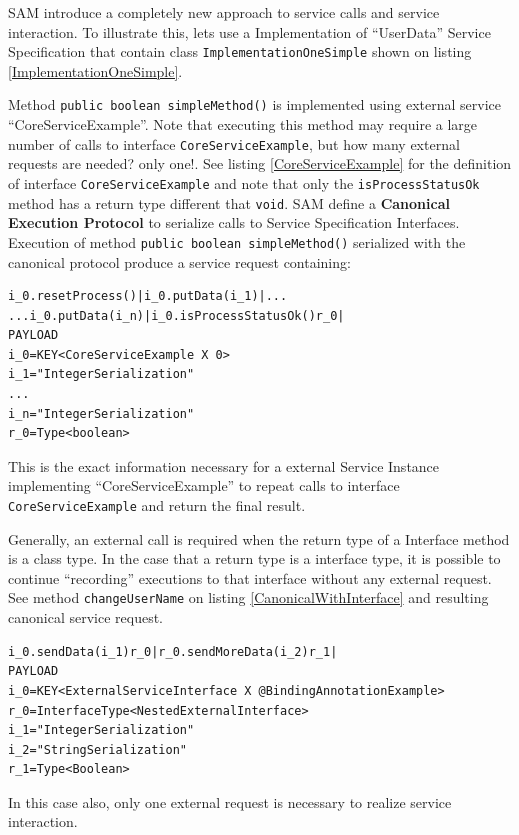 SAM introduce a completely new approach to service calls and service interaction. To illustrate this,  lets use a Implementation of ``UserData'' Service Specification that contain class \lstinline|ImplementationOneSimple| shown on listing \ref{ImplementationOneSimple}.



Method \lstinline|public boolean simpleMethod()| is implemented using external service ``CoreServiceExample''. Note that executing this method may require a large number of calls to interface \lstinline|CoreServiceExample|, but how many external requests are needed? only one!. See listing \ref{CoreServiceExample} for the definition of interface \lstinline|CoreServiceExample| and note that only the \lstinline|isProcessStatusOk| method has a return type different that \lstinline|void|. SAM define a \textbf{Canonical Execution Protocol} to serialize calls to Service Specification Interfaces. Execution of method \lstinline|public boolean simpleMethod()| serialized with the canonical protocol produce a service request containing:
\begin{verbatim}
i_0.resetProcess()|i_0.putData(i_1)|...
...i_0.putData(i_n)|i_0.isProcessStatusOk()r_0|
PAYLOAD
i_0=KEY<CoreServiceExample X 0>
i_1="IntegerSerialization"
...
i_n="IntegerSerialization"
r_0=Type<boolean>
\end{verbatim}

This is the exact information necessary for a external Service Instance implementing ``CoreServiceExample'' to repeat calls to interface \lstinline|CoreServiceExample| and return the final result.



Generally, an external call is required when the return type of a Interface method is a class type. In the case that a return type is a interface type, it is possible to continue ``recording'' executions to that interface without any external request. See method \lstinline|changeUserName| on listing \ref{CanonicalWithInterface} and resulting canonical service request.



\begin{verbatim}
i_0.sendData(i_1)r_0|r_0.sendMoreData(i_2)r_1|
PAYLOAD
i_0=KEY<ExternalServiceInterface X @BindingAnnotationExample>
r_0=InterfaceType<NestedExternalInterface>
i_1="IntegerSerialization"
i_2="StringSerialization"
r_1=Type<Boolean>
\end{verbatim}
In this case also, only one external request is necessary to realize service interaction.

